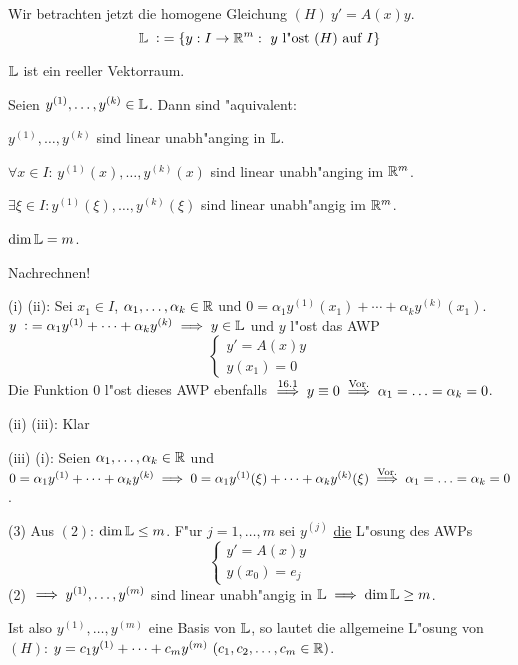 \documentclass{article}
\begin{document}
Wir betrachten jetzt die homogene Gleichung $(H)\ y'=A(x)y$.
\[
	\MdL\da \{y:I\to\MdR^m:\ y\text{ l"ost } (H) \text{ auf } I\}
\]
\begin{satz} %
\begin{liste}
\item $\mathbb{L}$ ist ein reeller Vektorraum.
\item Seien $y^{(1)},\ldots,y^{(k)}\in\mathbb{L}$. Dann sind "aquivalent:
\begin{liste}
\item $y^{(1)},\ldots,y^{(k)}$ sind linear unabh"anging in $\mathbb{L}$.
\item $\forall x\in I$: $y^{(1)}(x),\ldots, y^{(k)}(x)$ sind linear unabh"anging im $\mathbb{R}^m$.
\item $\exists \xi\in I: y^{(1)}(\xi),\ldots, y^{(k)}(\xi)$ sind linear unabh"angig im $\mathbb{R}^m$.
\end{liste}
\item $\dim \mathbb{L}=m$.
\end{liste}
\end{satz}
\begin{beweise}
\item Nachrechnen!
\item
\begin{liste}
\item[(i)]\folgt (ii): Sei $x_1\in I$, $\alpha_1, \ldots, \alpha_k\in\mathbb{R}$ und $0=\alpha_1 y^{(1)}(x_1)+\cdots+\alpha_k y^{(k)}(x_1)$.
$y\da \alpha_1 y^{(1)}+\cdots+\alpha_k y^{(k)}\folgt y\in\MdL$ und $y$ l"ost das AWP
\[
	\begin{cases}
		y'=A(x)y\\
		y(x_1)=0
	\end{cases}
\]
Die Funktion 0 l"ost dieses AWP ebenfalls $\overset{16.1}{\implies} y\equiv 0\overset{\text{Vor.}}{\implies}\alpha_1=\ldots=\alpha_k=0$.
\item[(ii)]\folgt (iii): Klar
\item[(iii)]\folgt (i): Seien $\alpha_1,\ldots,\alpha_k\in\mathbb{R}$ und $0=\alpha_1 y^{(1)}+\cdots+\alpha_k y^{(k)}\implies 0=\alpha_1 y^{(1)}(\xi)+\cdots+\alpha_ky^{(k)}(\xi)\overset{\text{Vor.}}{\implies}\alpha_1=\ldots=\alpha_k=0$.
\end{liste}
\item[(3)]Aus $(2)$: $\dim\mathbb{L}\le m$. F"ur $j=1,\dots,m$ sei $y^{(j)}$ \underline{die} L"osung des AWPs
\[
\begin{cases}
	y'=A(x)y\\
	y(x_0)=e_j
\end{cases}
\]
(2) $\implies y^{(1)},\dots, y^{(m)}$ sind linear unabh"angig in $\mathbb{L}\implies\dim\mathbb{L}\ge m$.
\end{beweise}
Ist also $y^{(1)},\ldots,y^{(m)}$ eine Basis von $\mathbb{L}$, so lautet die allgemeine L"osung von $(H)$:
$y=c_1y^{(1)}+\cdots+c_my^{(m)}\ (c_1,c_2,\ldots,c_m\in\MdR)$.
\end{document}
